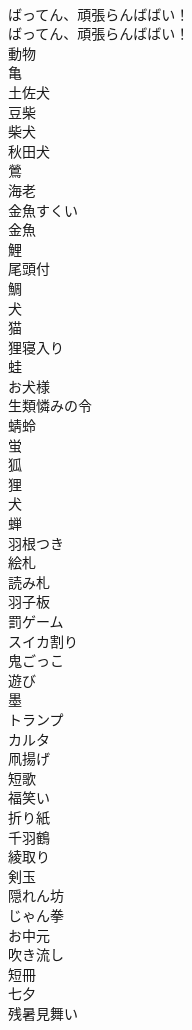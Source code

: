\documentclass[8pt]{extreport}
\begin{document}
\begin{CJK}{UTF8}{min}
\\	ばってん、頑張らんばばい！	
\\	ばってん、頑張らんばばい！ 
\\	動物
\\	亀
\\	土佐犬
\\	豆柴
\\	柴犬
\\	秋田犬
\\	鶯
\\	海老
\\	金魚すくい
\\	金魚
\\	鯉
\\	尾頭付
\\	鯛
\\	犬
\\	猫
\\	狸寝入り
\\	蛙
\\	お犬様
\\	生類憐みの令
\\	蜻蛉
\\	蛍
\\	狐
\\	狸
\\	犬
\\	蝉
\\	羽根つき
\\	絵札
\\	読み札
\\	羽子板
\\	罰ゲーム
\\	スイカ割り
\\	鬼ごっこ
\\	遊び
\\	墨
\\	トランプ
\\	カルタ
\\	凧揚げ
\\	短歌
\\	福笑い
\\	折り紙
\\	千羽鶴
\\	綾取り
\\	剣玉
\\	隠れん坊
\\	じゃん拳
\\	お中元
\\	吹き流し
\\	短冊
\\	七夕
\\	残暑見舞い

\end{CJK}
\end{document}

